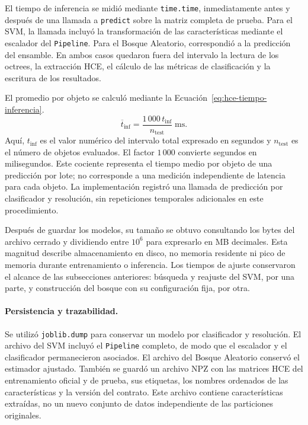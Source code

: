 El tiempo de inferencia se midió mediante \texttt{time.time}, inmediatamente antes y después de una llamada a \texttt{predict} sobre la matriz completa de prueba. Para el SVM, la llamada incluyó la transformación de las características mediante el escalador del \texttt{Pipeline}. Para el Bosque Aleatorio, correspondió a la predicción del ensamble. En ambos casos quedaron fuera del intervalo la lectura de los octrees, la extracción HCE, el cálculo de las métricas de clasificación y la escritura de los resultados.

El promedio por objeto se calculó mediante la Ecuación~\eqref{eq:hce-tiempo-inferencia}.
\begin{equation}
\overline t_{\mathrm{inf}}
=\frac{1\,000\,t_{\mathrm{inf}}}{n_{\mathrm{test}}}\;\mathrm{ms}.
\label{eq:hce-tiempo-inferencia}
\end{equation}
Aquí, $t_{\mathrm{inf}}$ es el valor numérico del intervalo total expresado en segundos y $n_{\mathrm{test}}$ es el número de objetos evaluados. El factor $1\,000$ convierte segundos en milisegundos. Este cociente representa el tiempo medio por objeto de una predicción por lote; no corresponde a una medición independiente de latencia para cada objeto. La implementación registró una llamada de predicción por clasificador y resolución, sin repeticiones temporales adicionales en este procedimiento.

Después de guardar los modelos, su tamaño se obtuvo consultando los bytes del archivo cerrado y dividiendo entre $10^6$ para expresarlo en MB decimales. Esta magnitud describe almacenamiento en disco, no memoria residente ni pico de memoria durante entrenamiento o inferencia. Los tiempos de ajuste conservaron el alcance de las subsecciones anteriores: búsqueda y reajuste del SVM, por una parte, y construcción del bosque con su configuración fija, por otra.

\paragraph{Persistencia y trazabilidad.}

Se utilizó \texttt{joblib.dump} para conservar un modelo por clasificador y resolución. El archivo del SVM incluyó el \texttt{Pipeline} completo, de modo que el escalador y el clasificador permanecieron asociados. El archivo del Bosque Aleatorio conservó el estimador ajustado. También se guardó un archivo NPZ con las matrices HCE del entrenamiento oficial y de prueba, sus etiquetas, los nombres ordenados de las características y la versión del contrato. Este archivo contiene características extraídas, no un nuevo conjunto de datos independiente de las particiones originales.

